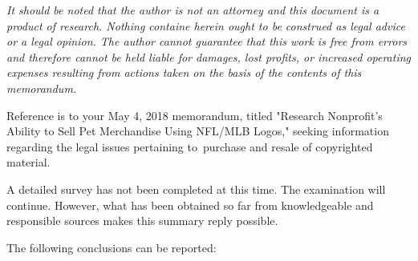 \documentclass[letterpaper,11pt]{texMemo}
\begin{document}
\maketitle

\emph{It should be noted that the author is not an attorney and this document is a product of research. Nothing containe herein ought to be construed as legal advice or a legal opinion. The author cannot guarantee that this work is free from errors and therefore cannot be held liable for damages, lost profits, or increased operating expenses resulting from actions taken on the basis of the contents of this memorandum.}

Reference is to your May 4, 2018 memorandum, titled "Research Nonprofit's Ability to Sell Pet Merchandise Using NFL/MLB Logos," seeking information regarding the legal issues pertaining to\ purchase and resale of copyrighted material.

A detailed survey has not been completed at this time.  The examination will continue.  However, what has been obtained so far from knowledgeable and responsible sources makes this summary reply possible.

The following conclusions can be reported:
\end{document}
